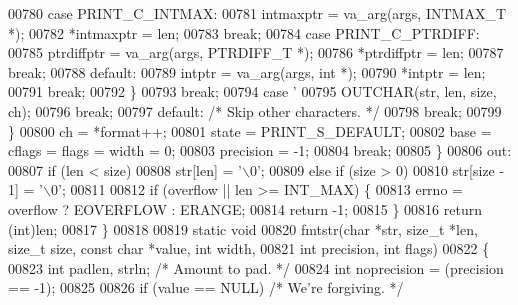 \begin{DoxyCode}
{{{{00780                 \textcolor{keywordflow}{case} PRINT\_C\_INTMAX:
00781                     intmaxptr = va\_arg(args, INTMAX\_T *);
00782                     *intmaxptr = len;
00783                     \textcolor{keywordflow}{break};
00784                 \textcolor{keywordflow}{case} PRINT\_C\_PTRDIFF:
00785                     ptrdiffptr = va\_arg(args, PTRDIFF\_T *);
00786                     *ptrdiffptr = len;
00787                     \textcolor{keywordflow}{break};
00788                 \textcolor{keywordflow}{default}:
00789                     intptr = va\_arg(args, \textcolor{keywordtype}{int} *);
00790                     *intptr = len;
00791                     \textcolor{keywordflow}{break};
00792                 \}
00793                 \textcolor{keywordflow}{break};
00794             \textcolor{keywordflow}{case} \textcolor{charliteral}{'%
00795                 OUTCHAR(str, len, size, ch);
00796                 \textcolor{keywordflow}{break};
00797             \textcolor{keywordflow}{default}:    \textcolor{comment}{/* Skip other characters. */}
00798                 \textcolor{keywordflow}{break};
00799             \}
00800             ch = *format++;
00801             state = PRINT\_S\_DEFAULT;
00802             base = cflags = flags = width = 0;
00803             precision = -1;
00804             \textcolor{keywordflow}{break};
00805         \}
00806 out:
00807     \textcolor{keywordflow}{if} (len < size)
00808         str[len] = \textcolor{charliteral}{'\(\backslash\)0'};
00809     \textcolor{keywordflow}{else} \textcolor{keywordflow}{if} (size > 0)
00810         str[size - 1] = \textcolor{charliteral}{'\(\backslash\)0'};
00811 
00812     \textcolor{keywordflow}{if} (overflow || len >= INT\_MAX) \{
00813         errno = overflow ? EOVERFLOW : ERANGE;
00814         \textcolor{keywordflow}{return} -1;
00815     \}
00816     \textcolor{keywordflow}{return} (\textcolor{keywordtype}{int})len;
00817 \}
00818 
00819 \textcolor{keyword}{static} \textcolor{keywordtype}{void}
00820 fmtstr(\textcolor{keywordtype}{char} *str, \textcolor{keywordtype}{size\_t} *len, \textcolor{keywordtype}{size\_t} size, \textcolor{keyword}{const} \textcolor{keywordtype}{char} *value, \textcolor{keywordtype}{int} width,
00821        \textcolor{keywordtype}{int} precision, \textcolor{keywordtype}{int} flags)
00822 \{
00823     \textcolor{keywordtype}{int} padlen, strln;  \textcolor{comment}{/* Amount to pad. */}
00824     \textcolor{keywordtype}{int} noprecision = (precision == -1);
00825 
00826     \textcolor{keywordflow}{if} (value == NULL)  \textcolor{comment}{/* We're forgiving. */}
}}}}}
\end{DoxyCode}
